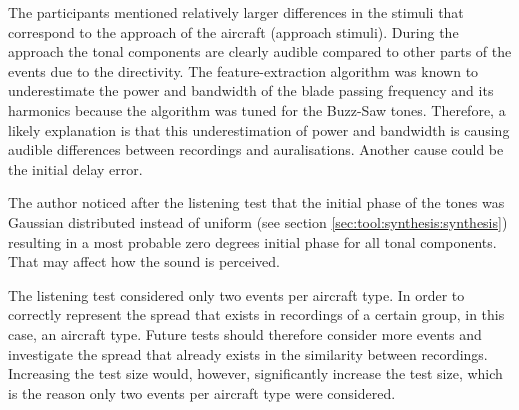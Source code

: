 

The participants mentioned relatively larger differences in the stimuli that
correspond to the approach of the aircraft (approach stimuli). During the
approach the tonal components are clearly audible compared to other parts of the
events due to the directivity. The feature-extraction algorithm was known to
underestimate the power and bandwidth of the blade passing frequency and its
harmonics because the algorithm was tuned for the Buzz-Saw tones. Therefore, a
likely explanation is that this underestimation of power and bandwidth is
causing audible differences between recordings and auralisations.
Another cause could be the initial delay error.

The author noticed after the listening test that the initial phase of the tones
was Gaussian distributed instead of uniform (see section
\ref{sec:tool:synthesis:synthesis}) resulting in a most probable zero degrees
initial phase for all tonal components. That may affect how the sound is
perceived.

The listening test considered only two events per aircraft type. In order to
correctly represent the spread that exists in recordings of a certain group, in
this case, an aircraft type. Future tests should therefore consider more events
and investigate the spread that already exists in the similarity between
recordings. Increasing the test size would, however, significantly increase the
test size, which is the reason only two events per aircraft type were
considered.

